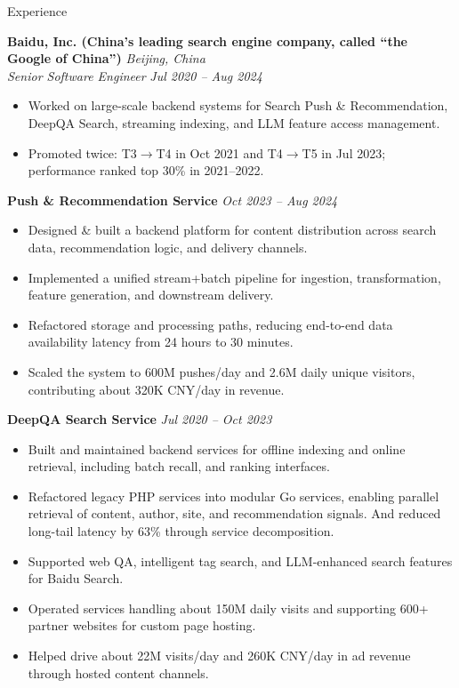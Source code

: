 \documentclass[]{resume}
\newcommand{\sectionvspace}{\vspace{1.5pt}}
\begin{document}
\begin{rSection}{Experience}\sectionvspace

\textbf{Baidu, Inc. (China’s leading search engine company, called “the Google of China”)} \hfill \textit{Beijing, China}\\
\textit{Senior Software Engineer} \hfill \textit{Jul 2020 -- Aug 2024}

\begin{itemize}[leftmargin=1.2em, itemsep=0.2em, topsep=0.2em]
    \item Worked on large-scale backend systems for Search Push \& Recommendation, DeepQA Search, streaming indexing, and LLM feature access management.
    \item Promoted twice: T3$\rightarrow$T4 in Oct 2021 and T4$\rightarrow$T5 in Jul 2023; performance ranked top 30\% in 2021--2022.
\end{itemize}

\vspace{0.5ex}
\textbf{Push \& Recommendation Service} \hfill \textit{Oct 2023 -- Aug 2024}
\begin{itemize}[leftmargin=1.2em, itemsep=0.2em, topsep=0.2em]
    \item Designed \& built a backend platform for content distribution across search data, recommendation logic, and delivery channels.
    \item Implemented a unified stream+batch pipeline for ingestion, transformation, feature generation, and downstream delivery.
    \item Refactored storage and processing paths, reducing end-to-end data availability latency from 24 hours to 30 minutes.
    \item Scaled the system to 600M pushes/day and 2.6M daily unique visitors, contributing about 320K CNY/day in revenue.
\end{itemize}

\vspace{0.5ex}
\textbf{DeepQA Search Service} \hfill \textit{Jul 2020 -- Oct 2023}
\begin{itemize}[leftmargin=1.2em, itemsep=0.2em, topsep=0.2em]
    \item Built and maintained backend services for offline indexing and online retrieval, including batch recall, and ranking interfaces.
    \item Refactored legacy PHP services into modular Go services, enabling parallel retrieval of content, author, site, and recommendation signals. And reduced long-tail latency by 63\% through service decomposition.
    \item Supported web QA, intelligent tag search, and LLM-enhanced search features for Baidu Search.
    \item Operated services handling about 150M daily visits and supporting 600+ partner websites for custom page hosting.
    \item Helped drive about 22M visits/day and 260K CNY/day in ad revenue through hosted content channels.
\end{itemize}


\end{rSection}
\end{document}
